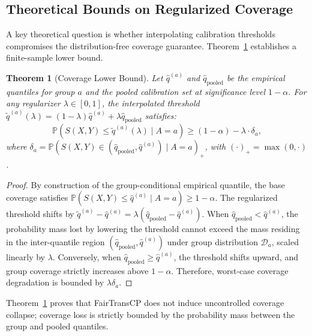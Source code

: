 \documentclass[twoside]{article}
\newtheorem{theorem}{Theorem}
\begin{document}
\subsection{Theoretical Bounds on Regularized Coverage}
A key theoretical question is whether interpolating calibration thresholds compromises the distribution-free coverage guarantee. Theorem~\ref{thm:bound} establishes a finite-sample lower bound.

\begin{theorem}[Coverage Lower Bound]
\label{thm:bound}
Let $\hat{q}^{(a)}$ and $\hat{q}_{\text{pooled}}$ be the empirical quantiles for group $a$ and the pooled calibration set at significance level $1-\alpha$. For any regularizer $\lambda \in [0, 1]$, the interpolated threshold $\tilde{q}^{(a)}(\lambda) = (1 - \lambda)\hat{q}^{(a)} + \lambda \hat{q}_{\text{pooled}}$ satisfies:
\begin{equation}
\mathbb{P}\left(S(X, Y) \le \tilde{q}^{(a)}(\lambda) \mid A=a\right) \ge (1-\alpha) - \lambda \cdot \delta_a,
\end{equation}
where $\delta_a = \mathbb{P}\left(S(X, Y) \in (\hat{q}_{\text{pooled}}, \hat{q}^{(a)}) \mid A=a\right)_+$, with $(\cdot)_+ = \max(0, \cdot)$.
\end{theorem}

\begin{proof}
By construction of the group-conditional empirical quantile, the base coverage satisfies $\mathbb{P}(S(X, Y) \le \hat{q}^{(a)} \mid A=a) \ge 1-\alpha$. The regularized threshold shifts by $\tilde{q}^{(a)} - \hat{q}^{(a)} = \lambda (\hat{q}_{\text{pooled}} - \hat{q}^{(a)})$. When $\hat{q}_{\text{pooled}} < \hat{q}^{(a)}$, the probability mass lost by lowering the threshold cannot exceed the mass residing in the inter-quantile region $(\hat{q}_{\text{pooled}}, \hat{q}^{(a)})$ under group distribution $\mathcal{D}_a$, scaled linearly by $\lambda$. Conversely, when $\hat{q}_{\text{pooled}} \ge \hat{q}^{(a)}$, the threshold shifts upward, and group coverage strictly increases above $1-\alpha$. Therefore, worst-case coverage degradation is bounded by $\lambda \delta_a$.
\end{proof}

Theorem~\ref{thm:bound} proves that FairTransCP does not induce uncontrolled coverage collapse; coverage loss is strictly bounded by the probability mass between the group and pooled quantiles.
\end{document}
